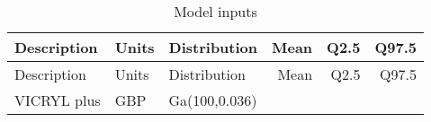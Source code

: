 \documentclass[
]{article}
\begin{document}
\begin{longtable}[]{@{}lllrrr@{}}
\caption{Model inputs}\tabularnewline
\toprule
\begin{minipage}[b]{0.16\columnwidth}\raggedright
Description\strut
\end{minipage} & \begin{minipage}[b]{0.09\columnwidth}\raggedright
Units\strut
\end{minipage} & \begin{minipage}[b]{0.19\columnwidth}\raggedright
Distribution\strut
\end{minipage} & \begin{minipage}[b]{0.08\columnwidth}\raggedleft
Mean\strut
\end{minipage} & \begin{minipage}[b]{0.09\columnwidth}\raggedleft
Q2.5\strut
\end{minipage} & \begin{minipage}[b]{0.09\columnwidth}\raggedleft
Q97.5\strut
\end{minipage}\tabularnewline
\midrule
\endfirsthead
\toprule
\begin{minipage}[b]{0.16\columnwidth}\raggedright
Description\strut
\end{minipage} & \begin{minipage}[b]{0.09\columnwidth}\raggedright
Units\strut
\end{minipage} & \begin{minipage}[b]{0.19\columnwidth}\raggedright
Distribution\strut
\end{minipage} & \begin{minipage}[b]{0.08\columnwidth}\raggedleft
Mean\strut
\end{minipage} & \begin{minipage}[b]{0.09\columnwidth}\raggedleft
Q2.5\strut
\end{minipage} & \begin{minipage}[b]{0.09\columnwidth}\raggedleft
Q97.5\strut
\end{minipage}\tabularnewline
\midrule
\endhead
\begin{minipage}[t]{0.16\columnwidth}\raggedright
VICRYL plus\strut
\end{minipage} & \begin{minipage}[t]{0.09\columnwidth}\raggedright
GBP\strut
\end{minipage} & \begin{minipage}[t]{0.19\columnwidth}\raggedright
Ga(100,0.036)\strut
\end{minipage} & \begin{minipage}[t]{0.08\columnwidth}\raggedleft

\end{minipage}
\end{longtable}
\end{document}

